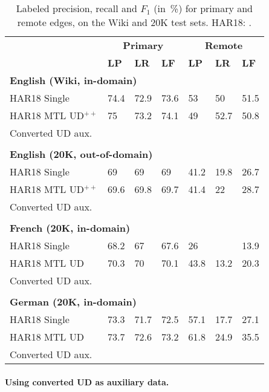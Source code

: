 \documentclass[11pt,a4paper]{article}
\begin{document}
\begin{table}[t]
\centering
\small
\setlength\tabcolsep{3pt}
\begin{tabular}{l|lll|lll}
& \multicolumn{3}{c|}{\footnotesize \bf Primary} & \multicolumn{3}{c}{\footnotesize \bf Remote} \\
& \footnotesize \textbf{LP} & \footnotesize \textbf{LR} & \footnotesize \textbf{LF}
& \footnotesize \textbf{LP} & \footnotesize \textbf{LR} & \footnotesize \textbf{LF} \\
\hline
\multicolumn{4}{l|}{\small \bf English (Wiki, in-domain)} & \\
\footnotesize HAR18 Single
& 74.4 & 72.9 & 73.6 & 53 & 50 & 51.5 \\
\footnotesize HAR18 MTL UD$^{++}$
& 75 & 73.2 & 74.1 & 49 & 52.7 & 50.8 \\
\footnotesize Converted UD aux.
\\
\hline\\
\multicolumn{4}{l|}{\small \bf English (20K, out-of-domain)} & \\
\footnotesize HAR18 Single
& 69 & 69 & 69 & 41.2 & 19.8 & 26.7 \\
\footnotesize HAR18 MTL UD$^{++}$
& 69.6 & 69.8 & 69.7 & 41.4 & 22 & 28.7 \\
\footnotesize Converted UD aux.
\\
\hline\\
\multicolumn{4}{l|}{\small \bf French (20K, in-domain)} & \\
\small HAR18 Single & 68.2 & 67 & 67.6 & 26 & \enskip 9.4 & 13.9 \\
\small HAR18 MTL UD & 70.3 & 70 & 70.1 & 43.8 & 13.2 & 20.3 \\
\footnotesize Converted UD aux.
\\
\hline\\
\multicolumn{4}{l|}{\small \bf German (20K, in-domain)} & \\
\small HAR18 Single & 73.3 & 71.7 & 72.5 & 57.1 & 17.7 & 27.1 \\
\small HAR18 MTL UD & 73.7 & 72.6 & 73.2 & 61.8 & 24.9 & 35.5 \\
\footnotesize Converted UD aux.
\\
\end{tabular}
\caption{
Labeled precision, recall and $F_1$ (in~\%) for primary and remote edges,
on the Wiki and 20K test sets.
HAR18: \protect{}.}\label{tab:aux_results}
\end{table}

\paragraph{Using converted UD as auxiliary data.}
\end{document}
